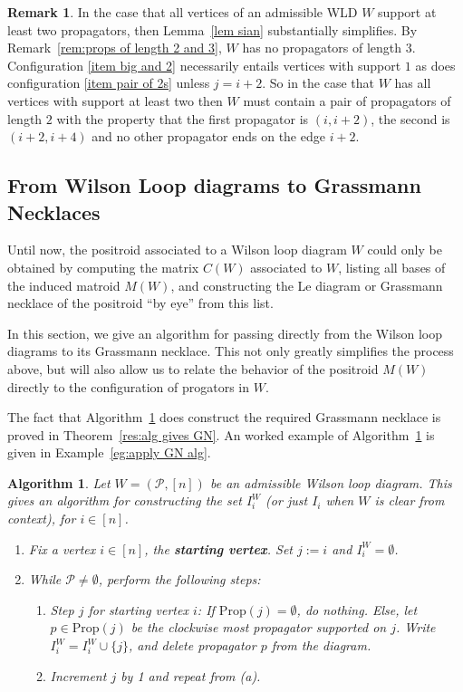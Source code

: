 \documentclass[11pt]{article}
\newcommand{\cP}{\mathcal{P}}
\newcommand{\Prop}{\textrm{Prop}}
\newtheorem{algorithm}[thm]{Algorithm}
\theoremstyle{remark}
\theoremstyle{definition}
\newtheorem{rmk}[thm]{Remark}
\begin{document}
\begin{rmk}
In the case that all vertices of an admissible WLD $W$ support at least two propagators, then Lemma~\ref{lem sian} substantially simplifies.  By Remark~\ref{rem:props of length 2 and 3}, $W$ has no propagators of length $3$.  Configuration \ref{item big and 2} necessarily entails vertices with support $1$ as does configuration \ref{item pair of 2s} unless $j=i+2$.  So in the case that $W$ has all vertices with support at least two then $W$ must contain a pair of propagators of length $2$  with the property that the first propagator is $(i, i+2)$, the second is $(i+2, i+4)$ and no other propagator ends on the edge $i+2$.
\end{rmk}


\subsection{From Wilson Loop diagrams to Grassmann Necklaces}\label{sec:GN alg}

Until now, the positroid associated to a Wilson loop diagram $W$ could only be obtained by computing the matrix $C(W)$ associated to $W$, listing all bases of the induced matroid $M(W)$, and constructing the Le diagram or Grassmann necklace of the positroid ``by eye'' from this list. 

In this section, we give an algorithm for passing directly from the Wilson loop diagrams to its Grassmann necklace. This not only greatly simplifies the process above, but will also allow us to relate the behavior of the positroid $M(W)$ directly to the configuration of progators in $W$.

The fact that Algorithm~\ref{alg:put GN on WLD} does construct the required Grassmann necklace is proved in Theorem~\ref{res:alg gives GN}. An worked example of Algorithm~\ref{alg:put GN on WLD} is given in Example~\ref{eg:apply GN alg}.

\begin{algorithm}\label{alg:put GN on WLD}
Let $W = (\cP, [n])$ be an admissible Wilson loop diagram. This gives an algorithm for constructing the set $I_i^W$ (or just $I_i$ when $W$ is clear from context), for $i \in [n]$.

\begin{enumerate}
\item Fix a vertex $i \in [n]$, the {\bf starting vertex}. Set $j:=i$ and $I_i^W = \emptyset$.
\item While $\cP \neq \emptyset$, perform the following steps:
\begin{enumerate}
\item {\em Step $j$ for starting vertex $i$}: If $\Prop(j) = \emptyset$, do nothing. Else, let $p \in \Prop(j)$ be the clockwise most propagator supported on $j$. Write $I_i^W = I_i^W\cup \{j\}$, and delete propagator $p$ from the diagram.
\item Increment $j$ by 1 and repeat from (a).
\end{enumerate}
\end{enumerate}
\end{algorithm}
\end{document}
